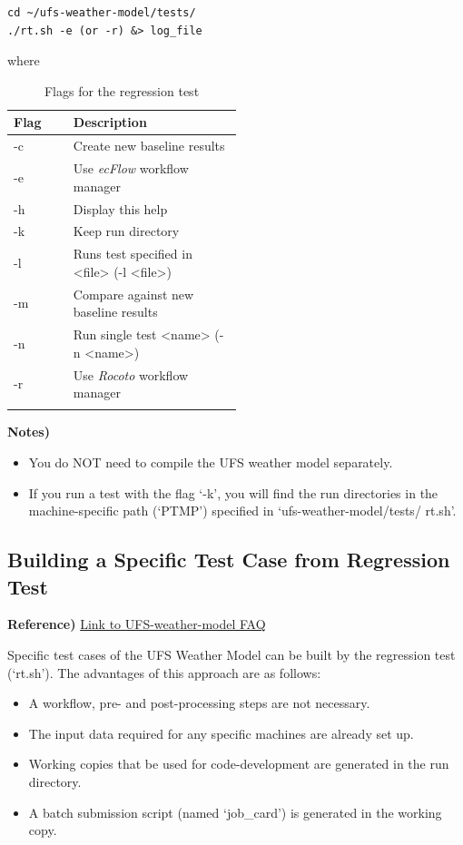 \documentclass[11pt,fleqn]{report}              %
\begin{document}
\lstset{language=bash}   
\begin{lstlisting}[frame=trBL]
cd ~/ufs-weather-model/tests/
./rt.sh -e (or -r) &> log_file
\end{lstlisting}
where
{
\fontsize{10}{12}\selectfont
\begin{longtable}{p{0.1\linewidth} | p{0.4\linewidth} }
\hline
\hline
 Flag & Description \\
\hline
 -c & Create new baseline results \\
 -e & Use {\it ecFlow} workflow manager \\
 -h & Display this help \\
 -k & Keep run directory \\
 -l & Runs test specified in <file> (-l <file>) \\
 -m & Compare against new baseline results  \\
 -n & Run single test <name> (-n <name>) \\
 -r & Use {\it Rocoto} workflow manager \\
\hline
\caption{Flags for the regression test}
\label{table:flag_regression}
\end{longtable}
}

{\bf Notes)} 
\begin{itemize}
\item You do NOT need to compile the UFS weather model separately.
\item If you run a test with the flag `-k', you will find the run directories in the machine-specific path (`PTMP') specified in `ufs-weather-model/tests/ rt.sh'.
\end{itemize}


\subsection{Building a Specific Test Case from Regression Test}

{\bf Reference)} \href{https://ufs-weather-model.readthedocs.io/en/ufs-v1.1.0/FAQ.html#how-do-i-build-and-run-a-single-test-of-the-ufs-weather-model}{Link to UFS-weather-model FAQ} 

\vspace{0.3cm}

Specific test cases of the UFS Weather Model can be built by the regression test (`rt.sh'). The advantages of this approach are as follows:
\begin{itemize}
\item A workflow, pre- and post-processing steps are not necessary.
\item The input data required for any specific machines are already set up.
\item Working copies that be used for code-development are generated in the run directory.
\item A batch submission script (named `job\_card') is generated in the working copy.
\end{itemize}
\end{document}
